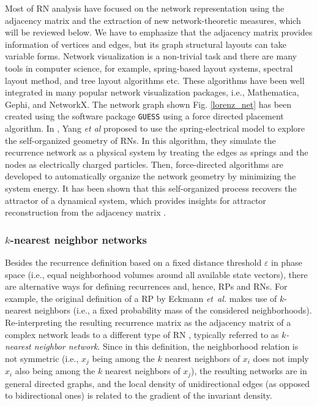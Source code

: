 	 	Most of RN analysis have focused on the network representation using the adjacency matrix and the extraction of new network-theoretic measures, which will be reviewed below. We have to emphasize that the adjacency matrix provides information of vertices and edges, but its graph structural layouts can take variable forms.  Network visualization is a non-trivial task and there are many tools in computer science, for example, spring-based layout systems, spectral layout method, and tree layout algorithms etc. These algorithms have been well integrated in many popular network visualization packages, i.e., Mathematica, Gephi, and NetworkX. The network graph shown Fig. \ref{lorenz_net} has been created using the software package {\tt{GUESS}} using a force directed placement algorithm. In \cite{Yang2013}, Yang {\textit{et al}} proposed to use the spring-electrical model to explore the self-organized geometry of RNs. In this algorithm, they simulate the recurrence network as a physical system by treating the edges as springs and the nodes as electrically charged particles. Then, force-directed algorithms are developed to automatically organize the network geometry by minimizing the system energy. It has been shown that this self-organized process recovers the attractor of a dynamical system, which provides insights for attractor reconstruction from the adjacency matrix \cite{thiel2004b,hirata2008}. 
			
	
		\subsubsection{$k$-nearest neighbor networks}
		Besides the recurrence definition based on a fixed distance threshold $\varepsilon$ in phase space (i.e., equal neighborhood volumes around all available state vectors), there are alternative ways for defining recurrences and, hence, RPs and RNs. For example, the original definition of a RP by Eckmann \textit{et~al.} \cite{Eckmann1987} makes use of $k$-nearest neighbors (i.e., a fixed probability mass of the considered neighborhoods). Re-interpreting the resulting recurrence matrix as the adjacency matrix of a complex network leads to a different type of RN \cite{Shimada2008}, typically referred to as \emph{$k$-nearest neighbor network}. Since in this definition, the neighborhood relation is not symmetric (i.e., $x_j$ being among the $k$ nearest neighbors of $x_i$ does not imply $x_i$ also being among the $k$ nearest neighbors of $x_j$), the resulting networks are in general directed graphs, and the local density of unidirectional edges (as opposed to bidirectional ones) is related to the gradient of the invariant density.
		

